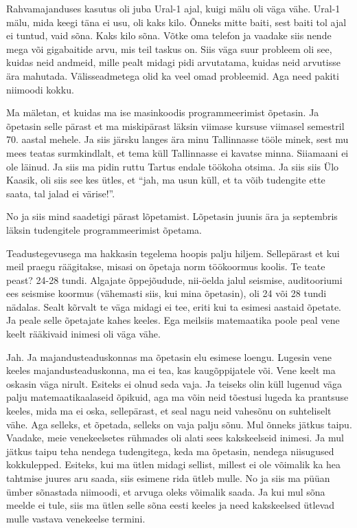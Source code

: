 
Rahvamajanduses kasutus oli juba Ural-1 ajal, kuigi mälu oli 
väga vähe. Ural-1 mälu, mida keegi täna ei usu, oli kaks kilo. Õnneks mitte 
baiti, sest baiti tol ajal ei tuntud, vaid sõna. Kaks kilo sõna. Võtke oma 
telefon ja vaadake siis nende mega või gigabaitide arvu, mis teil taskus on. 
Siis väga suur probleem oli see, kuidas neid andmeid, mille pealt midagi pidi 
arvutatama, kuidas neid  arvutisse ära mahutada. Välisseadmetega olid ka veel 
omad probleemid. Aga need pakiti niimoodi kokku. 

Ma mäletan, et kuidas ma ise masinkoodis programmeerimist õpetasin. Ja õpetasin 
selle pärast et ma miskipärast läksin viimase kursuse viimasel semestril 70. 
aastal mehele. Ja siis järsku langes ära minu Tallinnasse tööle minek, sest mu 
mees teatas surmkindlalt, et tema küll Tallinnasse ei kavatse minna. Siiamaani 
ei ole läinud. Ja siis  ma pidin ruttu Tartus endale töökoha otsima. Ja siis 
siis Ülo Kaasik,  oli siis see kes ütles, et 
\enquote{jah, ma usun küll, et ta võib tudengite ette saata, tal jalad ei 
värise!}. 

No ja siis mind saadetigi pärast lõpetamist. Lõpetasin juunis ära ja  
septembris läksin tudengitele programmeerimist õpetama. 


Teadustegevusega ma hakkasin tegelema hoopis palju hiljem. Sellepärast et kui 
meil praegu räägitakse,  misasi on õpetaja norm töökoormus koolis. Te teate 
peast? 24-28 tundi. Algajate õppejõudude, nii-öelda jalul seismise, 
auditooriumi ees seismise koormus (vähemasti siis, kui mina õpetasin), oli 24 
või 28 tundi nädalas. Sealt kõrvalt te väga midagi ei tee, eriti kui ta esimesi 
aastaid õpetate. Ja peale selle õpetajate kahes keeles. Ega meilsiis 
matemaatika poole peal vene keelt rääkivaid inimesi oli väga vähe. 


Jah. Ja majandusteaduskonnas ma õpetasin elu esimese loengu. Lugesin vene 
keeles majandusteaduskonna, ma ei tea, kas kaugõppijatele või. Vene keelt ma 
oskasin väga nirult. Esiteks ei olnud seda vaja. Ja teiseks olin küll lugenud 
väga palju matemaatikaalaseid õpikuid, aga ma võin neid tõestusi lugeda ka 
prantsuse keeles, mida ma ei oska, sellepärast, et seal nagu neid vahesõnu on 
suhteliselt vähe. Aga selleks, et õpetada, selleks on vaja palju sõnu. Mul 
õnneks jätkus taipu. Vaadake, meie venekeelsetes rühmades oli alati sees 
kakskeelseid inimesi. Ja mul jätkus taipu teha nendega tudengitega, keda ma 
õpetasin, nendega niisugused kokkulepped. Esiteks, kui ma ütlen midagi sellist, 
millest ei ole võimalik ka hea tahtmise juures aru saada, siis esimene rida 
ütleb mulle. No ja siis ma püüan ümber sõnastada niimoodi, et arvuga oleks 
võimalik saada. Ja kui mul sõna meelde ei tule, siis ma ütlen selle sõna eesti 
keeles ja need kakskeelsed ütlevad mulle vastava venekeelse termini. 

